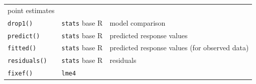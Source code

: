 \documentclass[]{book}
\begin{document}
\begin{longtable}[]{@{}lll@{}}
\begin{minipage}[t]{0.59\columnwidth}
point estimates\strut
\end{minipage}\tabularnewline
\begin{minipage}[t]{0.16\columnwidth}\raggedright
\texttt{drop1()}\strut
\end{minipage} & \begin{minipage}[t]{0.17\columnwidth}\raggedright
\texttt{stats} base R\strut
\end{minipage} & \begin{minipage}[t]{0.59\columnwidth}\raggedright
model comparison\strut
\end{minipage}\tabularnewline
\begin{minipage}[t]{0.16\columnwidth}\raggedright
\texttt{predict()}\strut
\end{minipage} & \begin{minipage}[t]{0.17\columnwidth}\raggedright
\texttt{stats} base R\strut
\end{minipage} & \begin{minipage}[t]{0.59\columnwidth}\raggedright
predicted response values\strut
\end{minipage}\tabularnewline
\begin{minipage}[t]{0.16\columnwidth}\raggedright
\texttt{fitted()}\strut
\end{minipage} & \begin{minipage}[t]{0.17\columnwidth}\raggedright
\texttt{stats} base R\strut
\end{minipage} & \begin{minipage}[t]{0.59\columnwidth}\raggedright
predicted response values (for observed data)\strut
\end{minipage}\tabularnewline
\begin{minipage}[t]{0.16\columnwidth}\raggedright
\texttt{residuals()}\strut
\end{minipage} & \begin{minipage}[t]{0.17\columnwidth}\raggedright
\texttt{stats} base R\strut
\end{minipage} & \begin{minipage}[t]{0.59\columnwidth}\raggedright
residuals\strut
\end{minipage}\tabularnewline
\begin{minipage}[t]{0.16\columnwidth}\raggedright
\texttt{fixef()}\strut
\end{minipage} & \begin{minipage}[t]{0.17\columnwidth}\raggedright
\texttt{lme4}\strut
\end{minipage} & \begin{minipage}[t]{0.59\columnwidth}\raggedright

\end{minipage}
\end{longtable}
\end{document}
